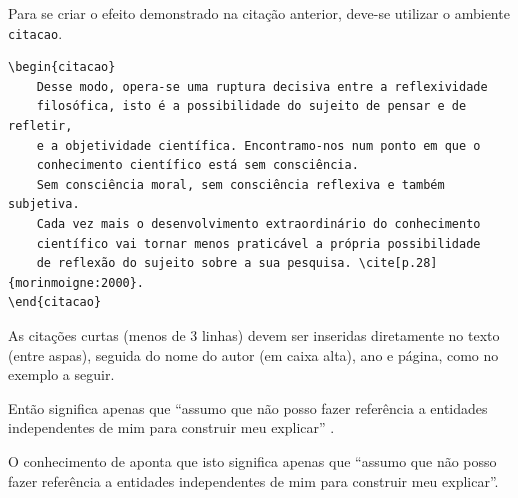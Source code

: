 Para se criar o efeito demonstrado na citação anterior, deve-se utilizar o ambiente \texttt{citacao}.
\begin{verbatim}
\begin{citacao}
    Desse modo, opera-se uma ruptura decisiva entre a reflexividade
    filosófica, isto é a possibilidade do sujeito de pensar e de refletir,
    e a objetividade científica. Encontramo-nos num ponto em que o 
    conhecimento científico está sem consciência.
    Sem consciência moral, sem consciência reflexiva e também subjetiva.
    Cada vez mais o desenvolvimento extraordinário do conhecimento 
    científico vai tornar menos praticável a própria possibilidade 
    de reflexão do sujeito sobre a sua pesquisa. \cite[p.28]{morinmoigne:2000}.
\end{citacao}
\end{verbatim}




As citações curtas (menos de 3 linhas) devem ser inseridas diretamente no texto (entre aspas), seguida do nome do autor (em caixa alta), ano e página, como no exemplo a seguir.

Então significa apenas que ``assumo que não posso fazer referência a entidades independentes de mim para construir meu explicar'' \cite[p.~35]{maturana:2003}.

O conhecimento de \textcite[p.~35]{maturana:2003} aponta que isto significa apenas que ``assumo que não posso fazer referência a entidades independentes de mim para construir meu explicar''.

